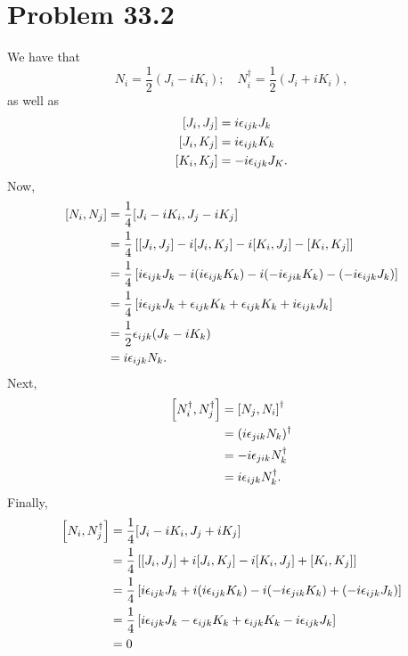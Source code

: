\documentclass[12pt]{article}
\begin{document}
\section*{Problem 33.2}
We have that
\[ N_i = \frac{1}{2}(J_i - iK_i); \quad N_i^\dag = \frac{1}{2}(J_i + iK_i), \]
as well as
\begin{align*}
    \comm{J_i}{J_j} &= i\epsilon_{ijk}J_k \\ 
    \comm{J_i}{K_j} &= i\epsilon_{ijk}K_k \\
    \comm{K_i}{K_j} &= -i\epsilon_{ijk}J_K.
\end{align*}
Now,
\begin{align*}
    \comm{N_i}{N_j} &= \frac{1}{4}\comm{J_i - iK_i}{J_j - iK_j} \\
    &= \frac{1}{4}\left[\comm{J_i}{J_j} - i\comm{J_i}{K_j} - i\comm{K_i}{J_j} - \comm{K_i}{K_j}\right] \\
    &= \frac{1}{4}\left[i\epsilon_{ijk}J_k - i(i\epsilon_{ijk}K_k) -i(-i\epsilon_{jik}K_k) - (-i\epsilon_{ijk}J_k)\right] \\
    &= \frac{1}{4}\left[i\epsilon_{ijk}J_k + \epsilon_{ijk}K_k + \epsilon_{ijk}K_k + i\epsilon_{ijk}J_k\right] \\
    &= \frac{1}{2}\epsilon_{ijk}(J_k - iK_k) \\
    &= i\epsilon_{ijk}N_k.
\end{align*}
Next,
\begin{align*}
    \comm{N_i^\dag}{N_j^\dag} &= \comm{N_j}{N_i}^\dag \\
    &= (i\epsilon_{jik}N_k)^\dag \\ 
    &= -i\epsilon_{jik}N_k^\dag \\
    &= i\epsilon_{ijk}N_k^\dag.
\end{align*}
Finally,
\begin{align*}
    \comm{N_i}{N_j^\dag} &= \frac{1}{4}\comm{J_i - iK_i}{J_j + iK_j} \\
    &= \frac{1}{4}\left[\comm{J_i}{J_j} + i\comm{J_i}{K_j} - i\comm{K_i}{J_j} + \comm{K_i}{K_j}\right] \\
    &= \frac{1}{4}\left[i\epsilon_{ijk}J_k + i(i\epsilon_{ijk}K_k) -i(-i\epsilon_{jik}K_k) + (-i\epsilon_{ijk}J_k)\right] \\
    &= \frac{1}{4}\left[i\epsilon_{ijk}J_k - \epsilon_{ijk}K_k + \epsilon_{ijk}K_k - i\epsilon_{ijk}J_k\right] \\
    &= 0
\end{align*}
\end{document}
